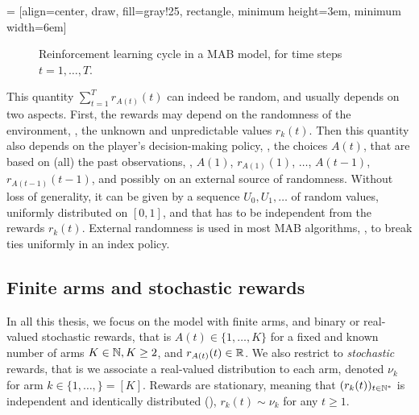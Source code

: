  = [align=center, draw, fill=gray!25, rectangle, minimum height=3em, minimum width=6em]
\begin{figure}[h!]
    \centering
\caption{Reinforcement learning cycle in a MAB model, for time steps $t=1,\dots,T$.}
\label{fig:2:ReinforcementLearningCycleMABmodel}
\end{figure}


This quantity $\sum_{t=1}^T r_{A(t)}(t)$ can indeed be random, and usually depends on two aspects.
First, the rewards may depend on the randomness of the environment, \ie, the unknown and unpredictable values $r_k(t)$.
Then this quantity also depends on the player's decision-making policy, \ie, the choices $A(t)$, that are based on (all) the past observations, \ie, $A(1)$, $r_{A(1)}(1)$, $\dots$, $A(t-1)$, $r_{A(t-1)}(t-1)$, and possibly on an external source of randomness.
%
Without loss of generality, it can be given by a sequence $U_0,U_1,\dots$ of \iid{} random values, uniformly distributed on $[0,1]$, and that has to be independent from the rewards $r_k(t)$.
External randomness is used in most MAB algorithms, \eg, to break ties uniformly in an index policy.


\subsection{Finite arms and stochastic rewards}


In all this thesis, we focus on the model with finite arms, and binary or real-valued stochastic rewards, that is $A(t)\in\{1,\dots,K\}$ for a fixed and known number of arms $K\in\mathbb{N},K\geq2$, and $r_{A(t)}(t)\in\mathbb{R}$.
%
%
We also restrict to \emph{stochastic} rewards, that is we associate a real-valued distribution to each arm, denoted $\nu_k$ for arm $k\in\{1,\dots,\}=[K]$.
Rewards are stationary, meaning that $(r_k(t))_{t\in\mathbb{N}^*}$ is independent and identically distributed (\iid), $r_k(t) \sim \nu_k$ for any $t\geq1$.

